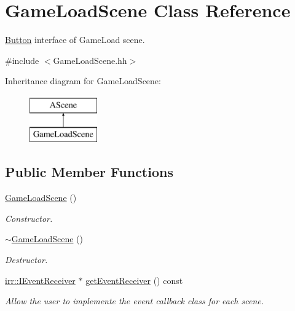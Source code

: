 \hypertarget{classGameLoadScene}{}\section{Game\+Load\+Scene Class Reference}
\label{classGameLoadScene}


\hyperlink{classButton}{Button} interface of Game\+Load scene.  




{\ttfamily \#include $<$Game\+Load\+Scene.\+hh$>$}

Inheritance diagram for Game\+Load\+Scene\+:\begin{figure}[H]
\begin{center}
\leavevmode
\includegraphics[height=2.000000cm]{classGameLoadScene}
\end{center}
\end{figure}
\subsection*{Public Member Functions}
\begin{DoxyCompactItemize}
\item 
\hyperlink{classGameLoadScene_a225786d3826577aa3743164b6262dc2b}{Game\+Load\+Scene} ()
\begin{DoxyCompactList}\small\item\em Constructor. \end{DoxyCompactList}\item 
\hyperlink{classGameLoadScene_a39c0f378455520c08d21e0642f35cd9b}{$\sim$\+Game\+Load\+Scene} ()
\begin{DoxyCompactList}\small\item\em Destructor. \end{DoxyCompactList}\item 
\hyperlink{classirr_1_1IEventReceiver}{irr\+::\+I\+Event\+Receiver} $\ast$ \hyperlink{classGameLoadScene_a81807790ad65bd2cf97a1e543cae2b74}{get\+Event\+Receiver} () const
\begin{DoxyCompactList}\small\item\em Allow the user to implemente the event callback class for each scene. \end{DoxyCompactList}\end{DoxyCompactItemize}


